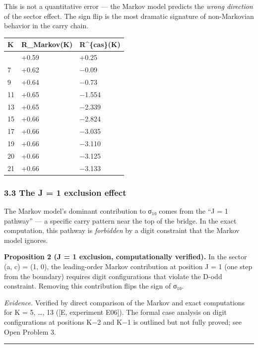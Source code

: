 \documentclass[
  11pt,
]{article}
\begin{document}
This is not a quantitative error --- the Markov model predicts the \emph{wrong
direction} of the sector effect. The sign flip is the most dramatic signature of
non-Markovian behavior in the carry chain.

\begin{longtable}[]{@{}lll@{}}
\toprule\noalign{}
K & R\_Markov(K) & R\^{}\{cas\}(K) \\
\midrule\noalign{}
\endhead
\bottomrule\noalign{}
\endlastfoot
5 & +0.59 & +0.25 \\
7 & +0.62 & −0.09 \\
9 & +0.64 & −0.73 \\
11 & +0.65 & −1.554 \\
13 & +0.65 & −2.339 \\
15 & +0.66 & −2.824 \\
17 & +0.66 & −3.035 \\
19 & +0.66 & −3.110 \\
20 & +0.66 & −3.125 \\
21 & +0.66 & −3.133 \\
\end{longtable}

\subsubsection{3.3 The J = 1 exclusion effect}\label{the-j-1-exclusion-effect}

The Markov model's dominant contribution to σ₁₀ comes from the ``J = 1 pathway''
--- a specific carry pattern near the top of the bridge. In the exact
computation, this pathway is \emph{forbidden} by a digit constraint that the
Markov model ignores.

\textbf{Proposition 2 (J = 1 exclusion, computationally verified).} In the
sector (a, c) = (1, 0), the leading-order Markov contribution at position J = 1
(one step from the boundary) requires digit configurations that violate the
D-odd constraint. Removing this contribution flips the sign of σ₁₀.

\emph{Evidence.} Verified by direct comparison of the Markov and exact
computations for K = 5, \ldots, 13 ({[}E, experiment E06{]}). The formal case
analysis on digit configurations at positions K−2 and K−1 is outlined but not
fully proved; see Open Problem 3.

\begin{center}\rule{0.5\linewidth}{0.5pt}\end{center}

\newpage
\end{document}

